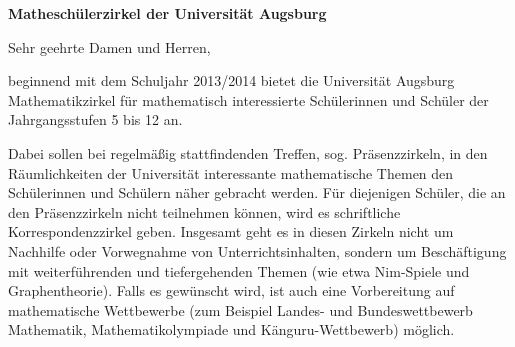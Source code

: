 \documentclass[a4paper,ngerman,12pt]{scrartcl}
\begin{document}
\setlength{\unitlength}{1cm}

\vspace{5cm}

\textbf{Matheschülerzirkel der Universität Augsburg}

Sehr geehrte Damen und Herren,

beginnend mit dem Schuljahr 2013/2014 bietet die Universität Augsburg
Mathematikzirkel für mathematisch interessierte Schülerinnen und Schüler der
Jahrgangsstufen 5 bis 12 an.

Dabei sollen bei regelmäßig stattfindenden Treffen, sog. Präsenzzirkeln, in den
Räum\-lich\-kei\-ten der Universität interessante mathematische Themen den
Schülerinnen und Schülern näher gebracht werden. Für diejenigen Schüler, die an
den Präsenzzirkeln nicht teilnehmen können, wird es schriftliche
Korrespondenzzirkel geben. Insgesamt geht es in diesen Zirkeln nicht um
Nachhilfe oder Vorwegnahme von Unterrichtsinhalten, sondern um Beschäftigung
mit weiterführenden und tiefergehenden Themen (wie etwa Nim-Spiele und
Graphentheorie). Falls es gewünscht wird, ist auch eine Vorbereitung auf
mathematische Wettbewerbe (zum Beispiel Landes- und Bundeswettbewerb
Mathematik, Mathematikolympiade und Känguru-Wettbewerb) möglich. 
\end{document}
